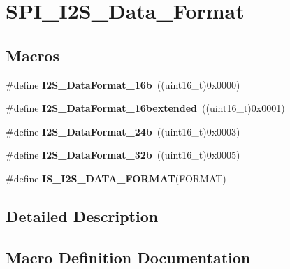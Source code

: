 \hypertarget{group___s_p_i___i2_s___data___format}{}\section{S\+P\+I\+\_\+\+I2\+S\+\_\+\+Data\+\_\+\+Format}
\label{group___s_p_i___i2_s___data___format}
\subsection*{Macros}
\begin{DoxyCompactItemize}
\item 
\hypertarget{group___s_p_i___i2_s___data___format_gabcd7cb799b68346a735709cc135bd414}{}\#define {\bfseries I2\+S\+\_\+\+Data\+Format\+\_\+16b}~((uint16\+\_\+t)0x0000)\label{group___s_p_i___i2_s___data___format_gabcd7cb799b68346a735709cc135bd414}

\item 
\hypertarget{group___s_p_i___i2_s___data___format_gae44b9704c9e393d5abec9bf4fcfe1116}{}\#define {\bfseries I2\+S\+\_\+\+Data\+Format\+\_\+16bextended}~((uint16\+\_\+t)0x0001)\label{group___s_p_i___i2_s___data___format_gae44b9704c9e393d5abec9bf4fcfe1116}

\item 
\hypertarget{group___s_p_i___i2_s___data___format_ga5a959486671cf00c5a734f1df205581b}{}\#define {\bfseries I2\+S\+\_\+\+Data\+Format\+\_\+24b}~((uint16\+\_\+t)0x0003)\label{group___s_p_i___i2_s___data___format_ga5a959486671cf00c5a734f1df205581b}

\item 
\hypertarget{group___s_p_i___i2_s___data___format_ga6be3bdcc713cb92a9ad247de013a5e37}{}\#define {\bfseries I2\+S\+\_\+\+Data\+Format\+\_\+32b}~((uint16\+\_\+t)0x0005)\label{group___s_p_i___i2_s___data___format_ga6be3bdcc713cb92a9ad247de013a5e37}

\item 
\#define {\bfseries I\+S\+\_\+\+I2\+S\+\_\+\+D\+A\+T\+A\+\_\+\+F\+O\+R\+M\+A\+T}(F\+O\+R\+M\+A\+T)
\end{DoxyCompactItemize}


\subsection{Detailed Description}


\subsection{Macro Definition Documentation}
\hypertarget{group___s_p_i___i2_s___data___format_gac467da829eca4a5c4ce41a6abd2d8e81}{}
